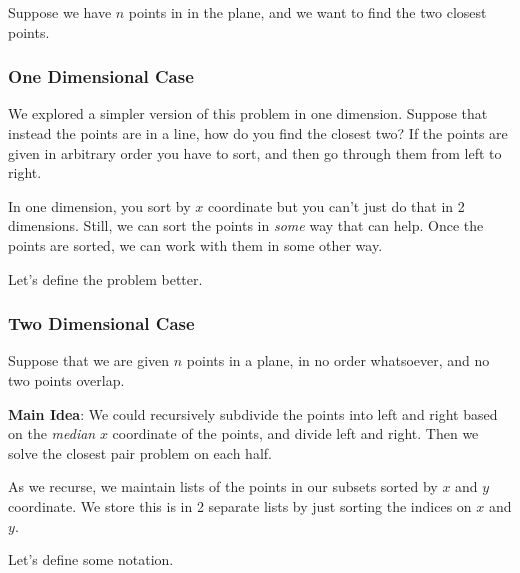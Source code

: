 \documentclass[12pt]{article}
\begin{document}
  Suppose we have $n$ points in in the plane, and we want to find the two closest
  points.

  \subsubsection{One Dimensional Case}
  We explored a simpler version of this problem in one dimension. Suppose that
  instead the points are in a line, how do you find the closest two? If the points
  are given in arbitrary order you have to sort, and then go through them from
  left to right.

  In one dimension, you sort by $x$ coordinate but you can't just do that in 2
  dimensions. Still, we can sort the points in {\it some} way that can help. Once
  the points are sorted, we can work with them in some other way.

  Let's define the problem better.

  \subsubsection{Two Dimensional Case}

  Suppose that we are given $n$ points in a plane, in no order whatsoever, and
  no two points overlap.


  {\bf Main Idea}: We could recursively subdivide the points into left and right
  based on the {\it median} $x$ coordinate of the points, and divide left and
  right. Then we solve the closest pair problem on each half.


  As we recurse, we maintain lists of the points in our subsets sorted by $x$ and
  $y$ coordinate. We store this is in 2 separate lists by just sorting the indices
  on $x$ and $y$.

  Let's define some notation.
\end{document}

